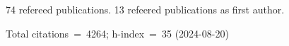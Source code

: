 74 refereed publications. 13 refeered publications as first author.

Total citations~=~4264; h-index~=~35 (2024-08-20)